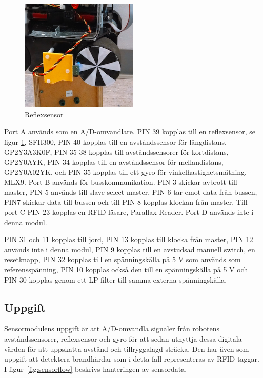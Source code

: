 \documentclass[a4paper,12pt,fleqn]{article}
\begin{document}
\begin{figure}[htp] %
  \begin{center}
  \includegraphics[keepaspectratio=true,width=0.5\textwidth]{../Kappa/reflexsensor.png}  %
  \end{center}
  \caption{Reflexsensor} %
  \label{fig:reflex} %
\end{figure}

Port A används som en A/D-omvandlare. PIN 39 kopplas till en reflexsensor, se figur \ref{fig:reflex}, SFH300, PIN 40 kopplas till en avståndssensor för långdistans, GP\-2Y\-3A\-3K\-0F, PIN 35-38 kopplas till avståndssensorer för kortdistans, GP\-2Y\-0A\-YK, 
PIN 34 kopplas till en avståndssensor för mellandistans, GP2Y0A02YK, och PIN 35 kopplas till ett gyro för vinkelhastighetsmätning, ML\-X9. Port B används för busskommunikation. PIN 3 skickar avbrott till master, PIN 5 används till slave select master, PIN 6 tar emot data från bussen, PIN7 skickar data till bussen och till PIN 8 kopplas klockan från master. Till port C PIN 23 kopplas en RFID-läsare, Parallax-Reader. Port D används inte i denna modul. 

PIN 31 och 11 kopplas till jord, PIN 13 kopplas till klocka från master, PIN 12 används inte i denna modul, PIN 9 kopplas till en avstudsad manuell switch, en resetknapp, PIN 32 kopplas till en spänningskälla på 5 V som används som referensspänning, PIN 10 kopplas också den till en spänningskälla på 5 V och PIN 30 kopplas genom ett LP-filter till samma externa spänningskälla.


\subsection{Uppgift}
Sensormodulens uppgift är att A/D-omvandla signaler från robotens avståndssensorer, reflexsensor och gyro för att sedan utnyttja dessa digitala värden för att uppskatta avstånd och tillryggalagd sträcka. Den har även som uppgift att detektera brandhärdar som i detta fall representeras av RFID-taggar. I figur~\ref{fig:sensorflow} beskrivs hanteringen av sensordata.
\end{document}
